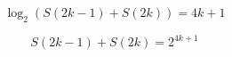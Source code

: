 \documentclass[12pt]{article}
\begin{document}
	
	\begin{equation}
		\log_{2} \left(  S(2k-1) + S(2k) \right)  = 4k + 1
	\end{equation}

	\begin{equation}
		S(2k-1) + S(2k) = 2^{4k + 1}
	\end{equation}
	
	
	
\end{document}
